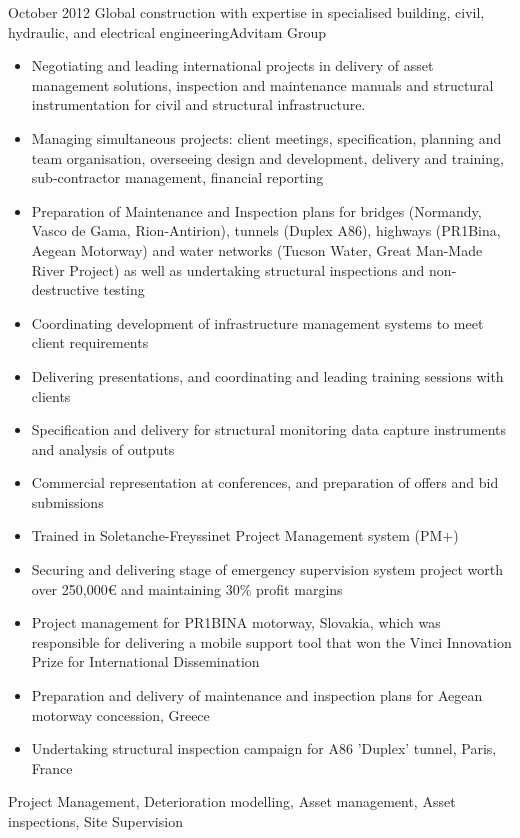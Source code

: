 \begin{experiences}
    {October 2012}   {Global construction with expertise in specialised building, civil, hydraulic, and electrical engineering}{Advitam Group}
      {
                      \begin{itemize}
                        \item Negotiating and leading international projects in delivery of asset management solutions, inspection and maintenance manuals and structural instrumentation for civil and structural infrastructure.
			\item Managing simultaneous projects: client meetings, specification, planning and team organisation, overseeing design and development, delivery and training, sub-contractor management, financial reporting
		\item Preparation of Maintenance and Inspection plans for bridges (Normandy, Vasco de Gama, Rion-Antirion), tunnels (Duplex A86), highways (PR1Bina, Aegean Motorway) and water networks (Tucson Water, Great Man-Made River Project) as well as undertaking structural inspections and non-destructive testing
		\item Coordinating development of infrastructure management systems to meet client requirements
		\item Delivering presentations, and coordinating and leading training sessions with clients
		\item Specification and delivery for structural monitoring data capture instruments and analysis of outputs
		\item Commercial representation at conferences, and preparation of offers and bid submissions
		\item Trained in Soletanche-Freyssinet Project Management system (PM+)
		\item Securing and delivering stage of emergency supervision system project worth over 250,000€ and maintaining 30\% profit margins
		\item Project management for PR1BINA motorway, Slovakia, which was responsible for delivering a mobile support tool that won the Vinci Innovation Prize for International Dissemination
	 	\item Preparation and delivery of maintenance and inspection plans for Aegean motorway concession, Greece
		\item Undertaking structural inspection campaign for A86 'Duplex' tunnel, Paris, France
                      \end{itemize}
                    }
                    {Project Management, Deterioration modelling, Asset management, Asset inspections, Site Supervision}

\end{experiences}
